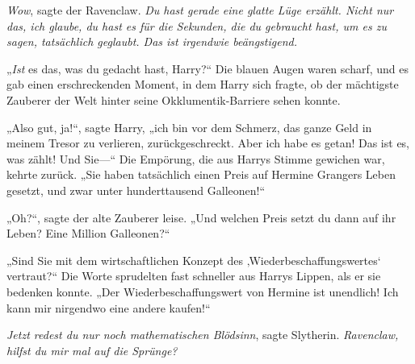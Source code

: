\emph{Wow}, sagte der Ravenclaw. \emph{Du hast gerade eine glatte Lüge erzählt. Nicht nur das, ich glaube, du hast es für die Sekunden, die du gebraucht hast, um es zu sagen, tatsächlich geglaubt. Das ist irgendwie beängstigend.}

„\emph{Ist} es das, was du gedacht hast, Harry?“
Die blauen Augen waren scharf, und es gab einen erschreckenden Moment, in dem Harry sich fragte, ob der mächtigste Zauberer der Welt hinter seine Okklumentik-Barriere sehen konnte.

„Also gut, ja!“, sagte Harry, „ich bin vor dem Schmerz, das ganze Geld in meinem Tresor zu verlieren, zurückgeschreckt. Aber ich habe es getan! Das ist es, was zählt! Und Sie—“
Die Empörung, die aus Harrys Stimme gewichen war, kehrte zurück.
„Sie haben tatsächlich einen Preis auf Hermine Grangers Leben gesetzt, und zwar unter hunderttausend Galleonen!“

„Oh?“, sagte der alte Zauberer leise. „Und welchen Preis setzt du dann auf ihr Leben? Eine Million Galleonen?“

„Sind Sie mit dem wirtschaftlichen Konzept des ‚Wiederbeschaffungswertes‘ vertraut?“ Die Worte sprudelten fast schneller aus Harrys Lippen, als er sie bedenken konnte. „Der Wiederbeschaffungswert von Hermine ist unendlich! Ich kann mir nirgendwo eine andere kaufen!“

\emph{Jetzt redest du nur noch mathematischen Blödsinn}, sagte Slytherin. \emph{Ravenclaw, hilfst du mir mal auf die Sprünge?}

